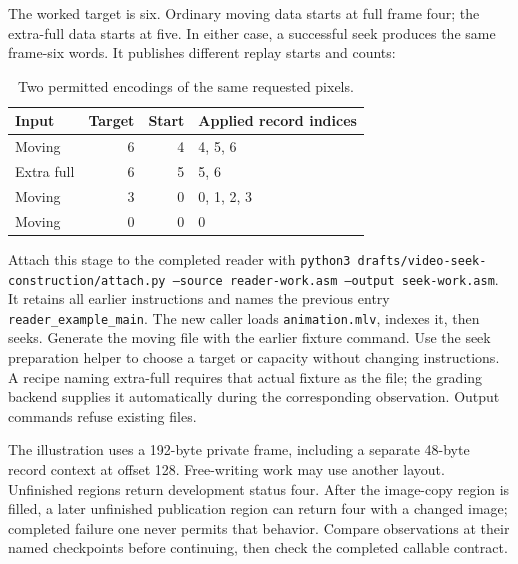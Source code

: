 The worked target is six. Ordinary moving data starts at full frame four; the
extra-full data starts at five. In either case, a successful seek produces the
same frame-six words. It publishes different replay starts and counts:

\begin{table}[htbp]
  \centering
  \caption{Two permitted encodings of the same requested pixels.}
  \begin{tabular}{l r r l}
    \toprule
    Input      & Target & Start & Applied record indices \\
    \midrule
    Moving     & 6      & 4     & 4, 5, 6                \\
    Extra full & 6      & 5     & 5, 6                   \\
    Moving     & 3      & 0     & 0, 1, 2, 3             \\
    Moving     & 0      & 0     & 0                      \\
    \bottomrule
  \end{tabular}
\end{table}

Attach this stage to the completed reader with
\texttt{python3 drafts/video-seek-construction/attach.py --source reader-work.asm
  --output seek-work.asm}. It retains all earlier instructions and names the previous
entry \texttt{reader\_example\_main}. The new caller loads \texttt{animation.mlv},
indexes it, then seeks. Generate the moving file with the earlier fixture command.
Use the seek preparation helper to choose a target or capacity without changing
instructions. A recipe naming extra-full requires that actual fixture as the file;
the grading backend supplies it automatically during the corresponding observation.
Output commands refuse existing files.

The illustration uses a 192-byte private frame, including a separate 48-byte record
context at offset 128. Free-writing work may use another layout. Unfinished regions
return development status four. After the image-copy region is filled, a later
unfinished publication region can return four with a changed image; completed
failure one never permits that behavior. Compare observations at their named
checkpoints before continuing, then check the completed callable contract.
